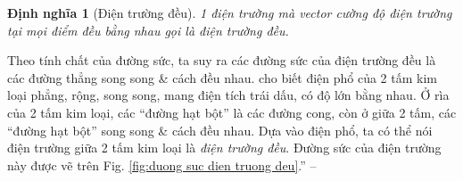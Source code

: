 \documentclass[oneside]{book}
\numberwithin{equation}{section}
\newtheorem{dinhnghia}{Định nghĩa}[section]
\begin{document}
\begin{dinhnghia}[Điện trường đều]
	1 điện trường mà vector cường độ điện trường tại mọi điểm đều bằng nhau gọi là \emph{điện trường đều}.
\end{dinhnghia}
Theo tính chất của đường sức, ta suy ra các đường sức của điện trường đều là các đường thẳng song song \& cách đều nhau. \cite[Hình 3.7: \textsf{Điện phổ của điện trường ở giữa 2 tấm kim loại phẳng, rộng, song song, mang điện tích trái dấu, có độ lớn bằng nhau}, p. 16]{SGK_Vat_Ly_11_nang_cao} cho biết điện phổ của 2 tấm kim loại phẳng, rộng, song song, mang điện tích trái dấu, có độ lớn bằng nhau. Ở rìa của 2 tấm kim loại, các ``đường hạt bột'' là các đường cong, còn ở giữa 2 tấm, các ``đường hạt bột'' song song \& cách đều nhau. Dựa vào điện phổ, ta có thể nói điện trường giữa 2 tấm kim loại là \textit{điện trường đều}. Đường sức của điện trường này được vẽ trên Fig. \ref{fig:duong suc dien truong deu}.'' -- \cite[p. 16]{SGK_Vat_Ly_11_nang_cao}
\end{document}
